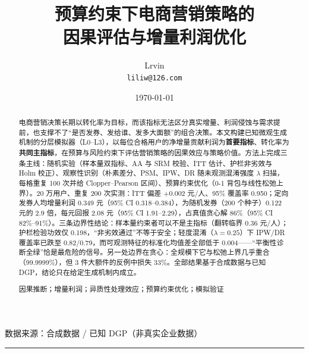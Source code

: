 \documentclass[UTF8, fontset=windows, a4paper, zihao=5]{ctexart}
\newcommand{\paperkeywords}[1]{%
  \par\vspace{8pt}\noindent{\sffamily\bfseries 关键词：}#1\par\vspace{4pt}}
\begin{document}
\title{%
  {\sffamily\bfseries 预算约束下电商营销策略的\\[2pt]
   因果评估与增量利润优化}}
\author{\sffamily Lrvin\\[2pt] \texttt{liliw@126.com}}
\date{\sffamily\today}

\maketitle
\thispagestyle{plain}

\vspace{-16pt}
\begin{center}
\footnotesize\sffamily 数据来源：合成数据 / 已知 DGP（非真实企业数据）
\end{center}
\vspace{-10pt}

\begin{abstract}
\linespread{1.15}\selectfont
\small
电商营销决策长期以转化率为目标，而该指标无法区分真实增量、利润侵蚀与需求提前，也支撑不了“是否发券、发给谁、发多大面额”的组合决策。本文构建已知微观生成机制的分层模拟器（L0--L3），以每位合格用户的净增量贡献利润为\textbf{首要指标}、转化率为\textbf{共同主指标}，在预算与风险约束下评估营销策略的因果效应与策略价值。方法上完成三条主线：随机实验（样本量双指标、AA 与 SRM 校验、ITT 估计、护栏非劣效与 Holm 校正）、观察性识别（朴素差分、PSM、IPW、DR 随未观测混淆强度 $\lambda$ 扫描，每格重复 100 次并给 Clopper--Pearson 区间）、预算约束优化（0-1 背包与线性松弛上界）。20 万用户、重复 200 次实测：ITT 偏差 $+0.002$ 元/人、95\% 覆盖率 0.950；定向发券人均增量利润 0.349 元（95\% CI 0.318--0.384），为随机发券（200 个种子）0.122 元的 2.9 倍，每元回报 2.08 元（95\% CI 1.91--2.29），占真值贪心解 86\%（95\% CI 82\%--91\%）。三条边界性结论：样本量约束者可以不是主指标（翻转临界 0.36 元/人）；护栏检验功效仅 0.198，“非劣效通过”不等于安全；轻度混淆（$\lambda=0.25$）下 IPW/DR 覆盖率已跌至 0.82/0.79，而可观测特征的标准化均值差全部低于 0.004——“平衡性诊断全绿”恰是最危险的信号。另一处边界在贪心：全规模下它与松弛上界几乎重合（99.9999\%），但 3 件大额件的反例中损失 33\%。全部结果基于合成数据与已知 DGP，结论只在给定生成机制内成立。

\paperkeywords{因果推断；增量利润；异质性处理效应；预算约束优化；模拟验证}
\end{abstract}

\vspace{2pt}
\noindent\rule{\linewidth}{0.4pt}

\setcounter{tocdepth}{1}
\newpage
\tableofcontents
\newpage


\end{document}
